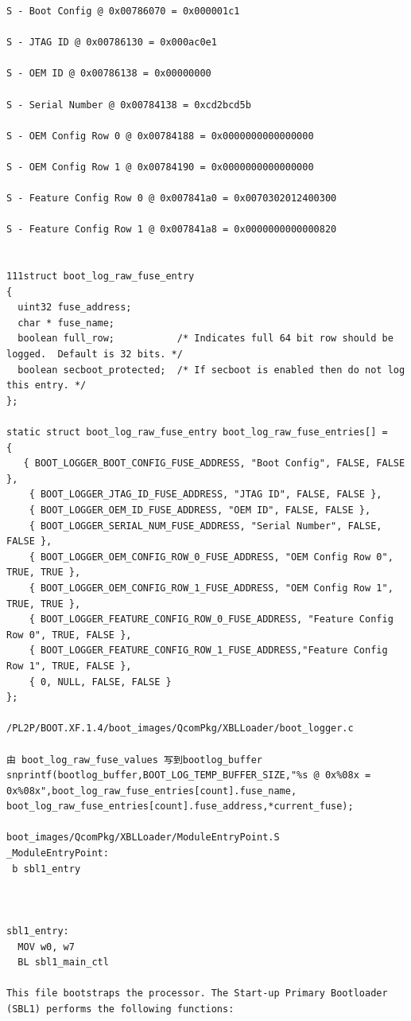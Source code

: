 \begin{lstlisting}
S - Boot Config @ 0x00786070 = 0x000001c1

S - JTAG ID @ 0x00786130 = 0x000ac0e1

S - OEM ID @ 0x00786138 = 0x00000000

S - Serial Number @ 0x00784138 = 0xcd2bcd5b

S - OEM Config Row 0 @ 0x00784188 = 0x0000000000000000

S - OEM Config Row 1 @ 0x00784190 = 0x0000000000000000

S - Feature Config Row 0 @ 0x007841a0 = 0x0070302012400300

S - Feature Config Row 1 @ 0x007841a8 = 0x0000000000000820


111struct boot_log_raw_fuse_entry
{
  uint32 fuse_address;
  char * fuse_name;
  boolean full_row;           /* Indicates full 64 bit row should be logged.  Default is 32 bits. */
  boolean secboot_protected;  /* If secboot is enabled then do not log this entry. */
};

static struct boot_log_raw_fuse_entry boot_log_raw_fuse_entries[] =
{
   { BOOT_LOGGER_BOOT_CONFIG_FUSE_ADDRESS, "Boot Config", FALSE, FALSE },
    { BOOT_LOGGER_JTAG_ID_FUSE_ADDRESS, "JTAG ID", FALSE, FALSE },
    { BOOT_LOGGER_OEM_ID_FUSE_ADDRESS, "OEM ID", FALSE, FALSE },
    { BOOT_LOGGER_SERIAL_NUM_FUSE_ADDRESS, "Serial Number", FALSE, FALSE },
    { BOOT_LOGGER_OEM_CONFIG_ROW_0_FUSE_ADDRESS, "OEM Config Row 0", TRUE, TRUE },
    { BOOT_LOGGER_OEM_CONFIG_ROW_1_FUSE_ADDRESS, "OEM Config Row 1", TRUE, TRUE },
    { BOOT_LOGGER_FEATURE_CONFIG_ROW_0_FUSE_ADDRESS, "Feature Config Row 0", TRUE, FALSE },
    { BOOT_LOGGER_FEATURE_CONFIG_ROW_1_FUSE_ADDRESS,"Feature Config Row 1", TRUE, FALSE },
    { 0, NULL, FALSE, FALSE }
};

/PL2P/BOOT.XF.1.4/boot_images/QcomPkg/XBLLoader/boot_logger.c 

由 boot_log_raw_fuse_values 写到bootlog_buffer
snprintf(bootlog_buffer,BOOT_LOG_TEMP_BUFFER_SIZE,"%s @ 0x%08x = 0x%08x",boot_log_raw_fuse_entries[count].fuse_name,
boot_log_raw_fuse_entries[count].fuse_address,*current_fuse);

boot_images/QcomPkg/XBLLoader/ModuleEntryPoint.S 
_ModuleEntryPoint:
 b sbl1_entry

 
 
sbl1_entry:
  MOV w0, w7
  BL sbl1_main_ctl
  
This file bootstraps the processor. The Start-up Primary Bootloader
(SBL1) performs the following functions:


\end{lstlisting}
